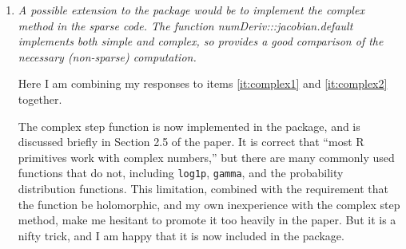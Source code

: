 \documentclass{article}
\newcommand{\code}[1]{\texttt{#1}}
\newcommand{\func}[1]{\code{#1}}
\newenvironment{revQuote}{\itshape}{\vspace{\baselineskip}}
\newenvironment{response}{\normalfont}{\vspace{\baselineskip}}
\begin{document}
\begin{enumerate}[align=left]
\begin{revQuote}
(Code removed)

This is still doing the calculation intensive Richardson approximation. The
calculation which would seem to most closely resemble what is done by
obj\$hessian() is

(Code removed)


Another very interesting comparison is

(Code removed)

The complex step derivative provides extremely accurate approximations with
a  number of function evaluation similar to the simple method. (This does
not seem to be anticipated by footnote 1 in the paper.) However, the method
imposes some serious requirements on the function. (Something like complex
analytic even though the user may only be interested in the real part.) The
code also has to accept complex arguments and return the complex result.
Fortunately most R primitive work with complex numbers so the code
requirement may happen accidentally, which can be partly verified by

binary.grad(P + 0+1i, data=binary, priors=priors, order.row=order.row)

returning a complex result. (This does not rule out all possible problems.)

As I recall, sums, multiplication, and exponentiation are all complex
analytic, so it would not be too surprising if the example in the paper is
too, but I have not analyzed that. However, based on the result being very
good, it seems highly likely.
  \end{revQuote}

  \begin{response}
    See response to Item \ref{it:complex2}
  \end{response}


\item\label{it:complex2} \begin{revQuote}
A possible extension to the package would be to implement the complex
method in the sparse code. The function numDeriv:::jacobian.default
implements both simple and complex, so provides a good comparison of the
necessary (non-sparse) computation. 

  \end{revQuote}

\begin{response}

Here I am combining my responses to items \ref{it:complex1} and
\ref{it:complex2} together.

  The complex step function is now implemented in the package, and is
  discussed briefly in Section 2.5 of the paper.  It is 
  correct that ``most R primitives work with complex numbers,''
  but there are many commonly used functions that do not, including 
  \func{log1p}, \func{gamma}, and the probability distribution
  functions. This limitation, combined with the requirement that the function be
  holomorphic, and my own inexperience with the complex step method, make
  me hesitant to promote it too heavily in the paper. But it is a nifty
  trick, and I am happy that it is now included in the package.
 

\end{response}
\end{enumerate}
\end{document}
